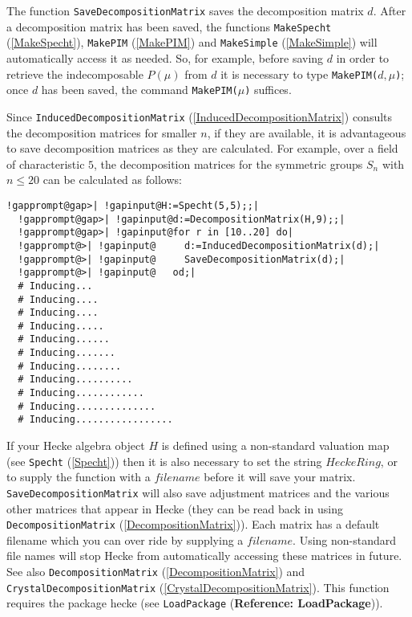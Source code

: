 \documentclass[a4paper,11pt]{report}
\begin{document}
{{{ The function \texttt{SaveDecompositionMatrix} saves the decomposition matrix $d$. After a decomposition matrix has been saved, the functions \texttt{MakeSpecht} (\ref{MakeSpecht}), \texttt{MakePIM} (\ref{MakePIM}) and \texttt{MakeSimple} (\ref{MakeSimple}) will automatically access it as needed. So, for example, before saving $d$ in order to retrieve the indecomposable $P(\mu)$ from $d$ it is necessary to type \texttt{MakePIM(}$d, \mu$\texttt{)}; once $d$ has been saved, the command \texttt{MakePIM(}$\mu$\texttt{)} suffices.

 Since \texttt{InducedDecompositionMatrix} (\ref{InducedDecompositionMatrix}) consults the decomposition matrices for smaller $n$, if they are available, it is advantageous to save decomposition matrices as
they are calculated. For example, over a field of characteristic $5$, the decomposition matrices for the symmetric groups $S_n$ with $n\leq 20$ can be calculated as follows: 
\begin{Verbatim}[commandchars=!@|,fontsize=\small,frame=single,label=Example]
  !gapprompt@gap>| !gapinput@H:=Specht(5,5);;|
  !gapprompt@gap>| !gapinput@d:=DecompositionMatrix(H,9);;|
  !gapprompt@gap>| !gapinput@for r in [10..20] do|
  !gapprompt@>| !gapinput@     d:=InducedDecompositionMatrix(d);|
  !gapprompt@>| !gapinput@     SaveDecompositionMatrix(d);|
  !gapprompt@>| !gapinput@   od;|
  # Inducing...
  # Inducing....
  # Inducing....
  # Inducing.....
  # Inducing......
  # Inducing.......
  # Inducing........
  # Inducing..........
  # Inducing............
  # Inducing..............
  # Inducing.................
\end{Verbatim}
 If your Hecke algebra object $H$ is defined using a non-standard valuation map (see \texttt{Specht} (\ref{Specht})) then it is also necessary to set the string $HeckeRing$, or to supply the function with a $filename$ before it will save your matrix. \texttt{SaveDecompositionMatrix} will also save adjustment matrices and the various other matrices that appear
in \textsf{Hecke} (they can be read back in using \texttt{DecompositionMatrix} (\ref{DecompositionMatrix})). Each matrix has a default filename which you can over ride by supplying a $filename$. Using non-standard file names will stop \textsf{Hecke} from automatically accessing these matrices in future. See also \texttt{DecompositionMatrix} (\ref{DecompositionMatrix}) and \texttt{CrystalDecompositionMatrix} (\ref{CrystalDecompositionMatrix}). This function requires the package \textsf{hecke} (see \texttt{LoadPackage} (\textbf{Reference: LoadPackage})). }

}}
\end{document}
